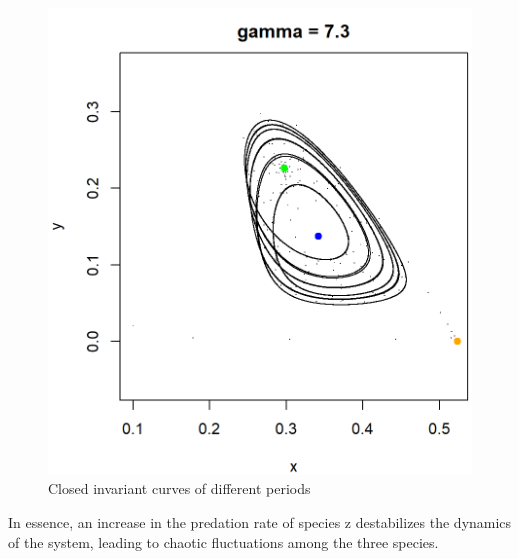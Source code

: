 \documentclass[10pt]{Configuration_Files/PoliMi3i_thesis}
\begin{document}
\begin{figure}[H]
\endminipage\hfill
{}
  \includegraphics[width=\linewidth]{images/Chapter 6.1/unnamed-chunk-6-1.png}
\endminipage
\caption{Closed invariant curves of different periods}
\label{fig:invariant_curves}
\end{figure}

In essence, an increase in the predation rate of species z destabilizes the dynamics of the system, leading to chaotic fluctuations among the three species.
\end{document}
